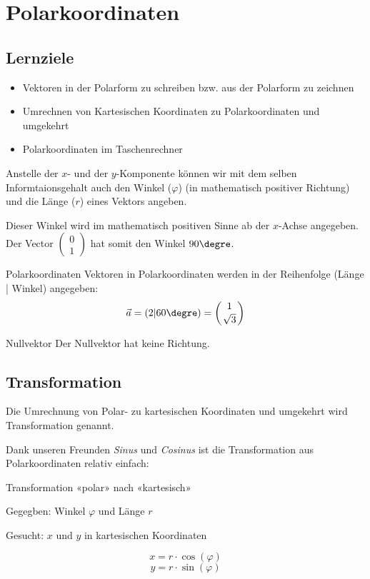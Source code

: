
\section{Polarkoordinaten}

\subsection*{Lernziele}
\begin{itemize}
\item Vektoren in der Polarform zu schreiben bzw. aus der Polarform zu
  zeichnen
\item Umrechnen von Kartesischen Koordinaten zu Polarkoordinaten und
  umgekehrt
\item Polarkoordinaten im Taschenrechner
\end{itemize}

Anstelle der $x$- und der $y$-Komponente können wir mit dem selben
Informtaionsgehalt auch den Winkel ($\varphi$)
(in mathematisch positiver Richtung) und die Länge ($r$) eines Vektors
angeben.


Dieser Winkel wird im mathematisch positiven Sinne ab der $x$-Achse
angegeben. Der Vector
$\begin{pmatrix}0\\1\end{pmatrix}$ hat somit den Winkel $90\degre$.
  \begin{definition}{Polarkoordinaten}{}
    Vektoren in Polarkoordinaten werden in der Reihenfolge (Länge |
    Winkel) angegeben:
    $$\vec{a} = (2 | 60\degre) = \left(1\atop \sqrt{3}\right)$$
    \end{definition}
  \begin{bemerkung}{Nullvektor}{}
    Der Nullvektor hat keine Richtung.
    \end{bemerkung}
  \newpage
\subsection{Transformation}
  Die Umrechnung von Polar- zu kartesischen
  Koordinaten und umgekehrt wird Transformation genannt.
  
  Dank unseren Freunden \textit{Sinus} und \textit{Cosinus} ist die
  Transformation aus Polarkoordinaten relativ einfach:
  \begin{rezept}{Transformation «polar» nach «kartesisch»}{}

    Gegegben:  Winkel $\varphi$ und Länge $r$

    Gesucht: $x$ und $y$ in kartesischen Koordinaten

    $$x = r\cdot{}\cos(\varphi)$$
    $$y = r\cdot{}\sin(\varphi)$$
  \end{rezept}

